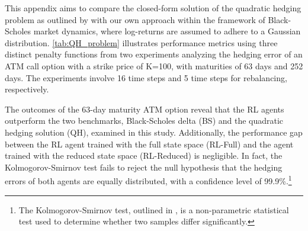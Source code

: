 This appendix aims to compare the closed-form solution of the quadratic hedging problem as outlined by \cite{godin2019closed} with our own approach within the framework of Black-Scholes market dynamics, where log-returns are assumed to adhere to a Gaussian distribution. \autoref{tab:QH_problem} illustrates performance metrics using three distinct penalty functions from two experiments analyzing the hedging error of an ATM call option with a strike price of K=100, with maturities of 63 days and 252 days. The experiments involve 16 time steps and 5 time steps for rebalancing, respectively. 

The outcomes of the 63-day maturity ATM option reveal that the RL agents outperform the two benchmarks, Black-Scholes delta (BS) and the quadratic hedging solution (QH), examined in this study. Additionally, the performance gap between the RL agent trained with the full state space (RL-Full) and the agent trained with the reduced state space (RL-Reduced) is negligible. In fact, the Kolmogorov-Smirnov test fails to reject the null hypothesis that the hedging errors of both agents are equally distributed, with a confidence level of 99.9\%.\footnote{The Kolmogorov-Smirnov test, outlined in \cite{KStest}, is a non-parametric statistical test used to determine whether two samples differ significantly.}

